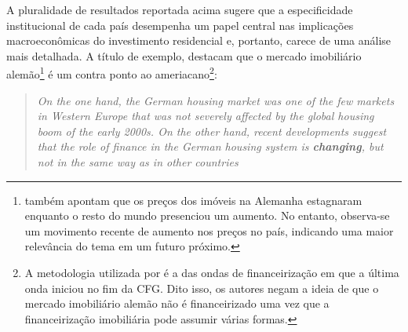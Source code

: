 A pluralidade de resultados reportada acima sugere que a especificidade institucional de cada país desempenha um papel central nas implicações macroeconômicas do investimento residencial e, portanto, carece de uma análise mais detalhada. A título de exemplo, \textcite{wijburg_alternative_2017} destacam que o mercado imobiliário alemão\footnote{
	\textcite{wijburg_alternative_2017} também apontam que os preços dos imóveis na Alemanha estagnaram enquanto o resto do mundo presenciou um aumento. No entanto, observa-se um movimento recente de aumento nos preços no país, indicando uma maior relevância do tema em um futuro próximo.} é um contra ponto ao ameriacano\footnote{
	A metodologia utilizada por \textcite{wijburg_alternative_2017} é a das ondas de financeirização em que a última onda iniciou no fim da CFG. Dito isso, os autores negam a ideia de que o mercado imobiliário alemão não é financeirizado uma vez que a financeirização imobiliária pode assumir várias formas.}:

\begin{quote}
	\textit{On the one hand, the German housing market was one of the few markets in Western Europe that was not severely affected by the global housing boom of the early 2000s. On the other hand, recent developments suggest that the role of finance in the German housing system is \textbf{changing}, but not in the same way as in other countries} \cite[p.~969, grifos adicionados]{wijburg_alternative_2017}
\end{quote} 



